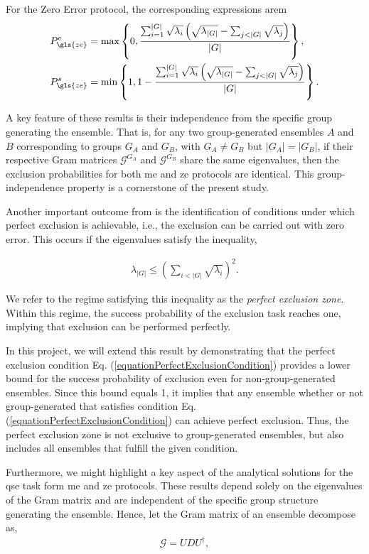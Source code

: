 \documentclass[12pt,letterpaper]{article}
\begin{document}
For the Zero Error protocol, the corresponding expressions arem
\begin{align*}
	P_{\gls{ze}}^e &= \max\left\{ 0, \frac{ \sum_{i=1}^{|G|} \sqrt{\lambda_i} \left( \sqrt{\lambda_{|G|}} - \sum_{j<|G|} \sqrt{\lambda_j} \right) }{|G|} \right\}, \\
	P_{\gls{ze}}^s &= \min\left\{ 1, 1 - \frac{ \sum_{i=1}^{|G|} \sqrt{\lambda_i} \left( \sqrt{\lambda_{|G|}} - \sum_{j<|G|} \sqrt{\lambda_j} \right) }{|G|} \right\}.
\end{align*}

A key feature of these results is their independence from the specific group generating the ensemble. That is, for any two group-generated ensembles $A$ and $B$ corresponding to groups $G_A$ and $G_B$, with $G_A \neq G_B$ but $|G_A| = |G_B|$, if their respective Gram matrices $\mathcal{G}^{G_A}$ and $\mathcal{G}^{G_B}$ share the same eigenvalues, then the exclusion probabilities for both \gls{me} and \gls{ze} protocols are identical. This group-independence property is a cornerstone of the present study.

Another important outcome from \cite{MainPaper} is the identification of conditions under which perfect exclusion is achievable, i.e., the exclusion can be carried out with zero error. This occurs if the eigenvalues satisfy the inequality,

\begin{align}\label{equationPerfectExclusionCondition}
	\lambda_{|G|} \leq \left( \sum_{i<|G|} \sqrt{\lambda_i} \right)^2.
\end{align}

We refer to the regime satisfying this inequality as the \emph{perfect exclusion zone}. Within this regime, the success probability of the exclusion task reaches one, implying that exclusion can be performed perfectly.

In this project, we will extend this result by demonstrating that the perfect exclusion condition Eq. (\ref{equationPerfectExclusionCondition}) provides a lower bound for the success probability of exclusion even for non-group-generated ensembles. Since this bound equals 1, it implies that any ensemble whether or not group-generated that satisfies condition Eq. (\ref{equationPerfectExclusionCondition}) can achieve perfect exclusion. Thus, the perfect exclusion zone is not exclusive to group-generated ensembles, but also includes all ensembles that fulfill the given condition.

Furthermore, we might highlight a key aspect of the analytical solutions for the \gls{qse} task form \gls{me} and \gls{ze} protocols. These results depend solely on the eigenvalues of the Gram matrix and are independent of the specific group structure generating the ensemble. Hence, let the Gram matrix of an ensemble decompose as,
\begin{align*}
	\mathcal{G} = U D U^\dagger,
\end{align*}
\end{document}
